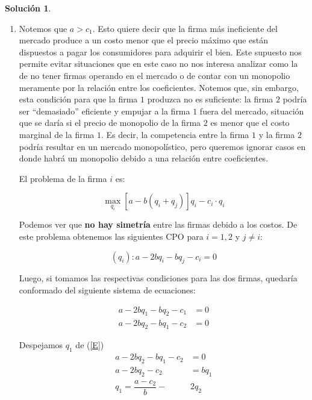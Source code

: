 \documentclass[a4paper, 11pt]{article}
\theoremstyle{definition}
\newtheorem{solucion}{Soluci\'on}
\begin{document}
\begin{solucion} %
\
\begin{enumerate}[label=(\alph*)]
\item
Notemos que $a>c_1$. Esto quiere decir que la firma más ineficiente del mercado produce a un costo menor que el precio máximo que están dispuestos a pagar los consumidores para adquirir el bien. Este supuesto nos permite evitar situaciones que en este caso no nos interesa analizar como la de no tener firmas operando en el mercado o de contar con un monopolio meramente por la relación entre los coeficientes. Notemos que, sin embargo, esta condición para que la firma $1$ produzca no es suficiente: la firma $2$ podría ser ``demasiado'' eficiente y empujar a la firma $1$ fuera del mercado, situación que se daría si el precio de monopolio de la firma $2$ es menor que el costo marginal de la firma $1$. Es decir, la competencia  entre la firma $1$ y la firma $2$ podría resultar en un mercado monopolístico, pero queremos ignorar casos en donde habrá un monopolio debido a una relación entre coeficientes. 

El problema de la firma $i$ es:

\vspace*{-12pt}

\[\displaystyle\max_{q_i}[a-b(q_i+q_j)]q_i-c_i\cdot q_i\]

Podemos ver que \textbf{no hay simetría} entre las firmas debido a los costos. De este problema obtenemos las siguientes CPO para $i=1,2$ y $j\neq i$:

\vspace*{-12pt}

\[(q_i): a-2bq_i-bq_j-c_i=0\]

 Luego, si tomamos las respectivas condiciones para las dos firmas, quedaría conformado del siguiente sistema de ecuaciones:
 
 \vspace*{-28pt}
 
 \begin{align}
 a-2bq_1-bq_2-c_1&=0 \label{D}\\
 a-2bq_2-bq_1-c_2&=0 \label{E}
 \end{align}
 
 Despejamos  $q_1$  de (\ref{E})
 \vspace*{-12pt}
 \begin{align*}
a-2bq_2-bq_1-c_2&=0\\
a-2bq_2-c_2&=bq_1\\
q_1=\dfrac{a-c_2}{b}-&2q_2
\end{align*}


\end{enumerate}
\end{solucion}
\end{document}
